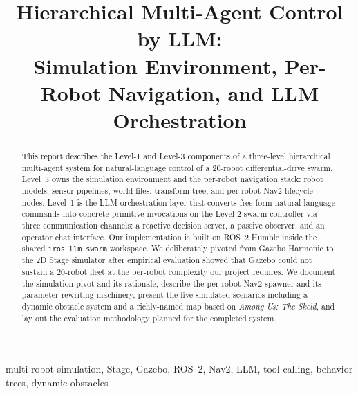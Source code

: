 \documentclass[conference]{IEEEtran}
\begin{document}
\title{Hierarchical Multi-Agent Control by LLM:\\
Simulation Environment, Per-Robot Navigation, and LLM Orchestration}

\author{
\and
{}
\and
{}
}

\maketitle

\begin{abstract}
This report describes the Level-1 and Level-3 components of a
three-level hierarchical multi-agent system for natural-language
control of a 20-robot differential-drive swarm. Level~3 owns the
simulation environment and the per-robot navigation stack:
robot models, sensor pipelines, world files, transform tree,
and per-robot Nav2 lifecycle nodes. Level~1 is the LLM
orchestration layer that converts free-form natural-language
commands into concrete primitive invocations on the Level-2
swarm controller via three communication channels: a reactive
decision server, a passive observer, and an operator chat
interface. Our implementation is built on ROS~2 Humble inside
the shared \texttt{iros\_llm\_swarm} workspace. We deliberately
pivoted from Gazebo Harmonic to the 2D Stage simulator after
empirical evaluation showed that Gazebo could not sustain a
20-robot fleet at the per-robot complexity our project requires.
We document the simulation pivot and its rationale, describe the
per-robot Nav2 spawner and its parameter rewriting machinery,
present the five simulated scenarios including a dynamic obstacle
system and a richly-named map based on \emph{Among Us: The
Skeld}, and lay out the evaluation methodology planned for the
completed system.
\end{abstract}

\begin{IEEEkeywords}
multi-robot simulation, Stage, Gazebo, ROS~2, Nav2, LLM, tool
calling, behavior trees, dynamic obstacles
\end{IEEEkeywords}
\end{document}

